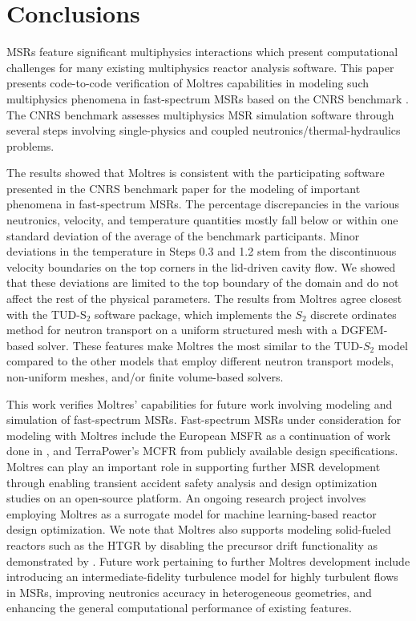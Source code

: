 \section{Conclusions}

\glspl{MSR} feature significant multiphysics interactions which present
computational challenges for many existing multiphysics reactor analysis
software. This paper presents code-to-code verification of Moltres
capabilities in modeling such multiphysics phenomena in fast-spectrum
\glspl{MSR} based on the CNRS benchmark \cite{tiberga_results_2020}.
The CNRS benchmark assesses multiphysics \gls{MSR} simulation
software through several steps involving single-physics and coupled
neutronics/thermal-hydraulics problems.

The results showed that Moltres is consistent with the participating software
presented in the CNRS benchmark paper for the modeling of important phenomena
in fast-spectrum \glspl{MSR}. The percentage discrepancies in the various
neutronics, velocity, and temperature quantities mostly fall below or within
one standard deviation of the average of the benchmark participants.
Minor deviations in the temperature in Steps 0.3 and 1.2 
stem from the discontinuous velocity
boundaries on the top corners in the lid-driven cavity flow. We showed that
these deviations are limited to the top boundary of the domain and do not
affect the rest of the physical parameters. The results from
Moltres agree closest with the TUD-S$_2$ software package, which implements the
$S_2$ discrete ordinates method for
neutron transport on a uniform structured mesh with a \gls{DGFEM}-based solver.
These features make Moltres the most similar to the TUD-$S_2$ model compared
to the other models that employ different neutron transport models,
non-uniform meshes, and/or finite volume-based solvers.

This work verifies Moltres' capabilities for future work involving modeling and
simulation of fast-spectrum \glspl{MSR}. Fast-spectrum \glspl{MSR}
under consideration for modeling with Moltres include the European \gls{MSFR}
as a continuation of work done in \cite{park_advancement_2020}, and
TerraPower's \gls{MCFR} \cite{terrapower_terrapower_2021} from publicly
available design specifications. Moltres can play an important role in
supporting further \gls{MSR} development through enabling transient accident
safety analysis and design optimization studies on an open-source platform.
An ongoing research project involves employing Moltres as a
surrogate model for machine learning-based reactor design optimization.
We note that Moltres also supports modeling solid-fueled reactors such as the
\gls{HTGR} by disabling the precursor drift functionality as demonstrated by
\cite{fairhurst-agosta_multi-physics_2020}. Future work pertaining to
further Moltres development include introducing an intermediate-fidelity
turbulence model for highly turbulent flows in \glspl{MSR}, improving
neutronics accuracy in heterogeneous geometries, and enhancing the general
computational performance of existing features.

\FloatBarrier
